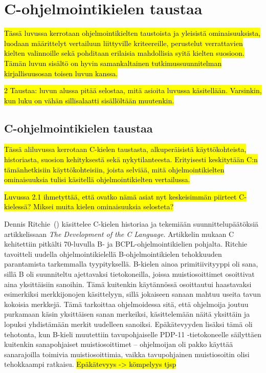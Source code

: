 \section{C-ohjelmointikielen taustaa}

\hl{Tässä luvussa kerrotaan ohjelmointikielten taustoista ja yleisistä
ominaisuuksista, luodaan määrittelyt vertailuun liittyville kriteereille,
perustelut verrattavien kielten valinnoille sekä pohditaan erilaisia
mahdollisia syitä kielten suosioon. Tämän luvun sisältö on hyvin samankaltainen
tutkimussuunnitelman kirjallisuusosan toisen luvun kanssa.}

\hl{ 2 Taustaa: luvun alussa pitää selostaa, mitä asioita luvussa käsitellään.
Varsinkin, kun luku on vähän sillisalaatti sisällöltään muutenkin. }

\subsection{C-ohjelmointikielen taustaa}
\label{sec:ctaustaa}

\hl{Tässä aliluvussa kerrotaan C-kielen taustasta, alkuperäisistä
käyttökohteista, historiasta, suosion kehityksestä sekä nykytilanteesta.
Erityisesti keskitytään C:n tämänhetkisiin käyttökohteisiin, joista selviää,
mitä ohjelmointikielten ominaisuuksia tulisi käsitellä ohjelmointikielten
vertailussa.}

\hl{ Luvussa 2.1 ihmetyttää, että ovatko nämä asiat nyt keskeisimmän piirteet
C-kielessä? Miksei muita kielen ominaisuuksia selosteta? }

Dennis Ritchie~(\citeyear{chistory}) käsittelee C-kielen historiaa ja
tekemiään suunnittelupäätöksiä artikkelissaan \emph{The Development of the C
Language}. Artikkelin mukaan C kehitettiin pitkälti 70-luvulla B- ja
BCPL-ohjelmointikielien pohjalta. Ritchie tavoitteli uudella
ohjelmointikielellä B-ohjelmointikielen tehokkuuden parantamista tarkemmalla
tyypityksellä. B-kielen ainoa primitiivityyppi oli sana, sillä B oli suunniteltu ajettavaksi
tietokoneilla, joissa muistiosoittimet osoittivat aina yksittäisiin sanoihin.
Tämä kuitenkin käytännössä osoittautui haastavaksi esimerkiksi merkkijonojen
käsittelyyn, sillä jokaiseen sanaan mahtuu useita tavun kokoisia
merkkejä. Tämä tarkoittaa ohjelmoidessa sitä, että ohjelmoija joutuu purkamaan
käsin yksittäisen sanan merkeiksi, käsittelemään näitä yksittäin ja lopuksi
yhdistämään merkit uudelleen sanoiksi. Epäkätevyyden lisäksi tämä oli
tehotonta, kun B-kieli muutettiin tavupohjaiselle PDP-11 -tietokoneelle
säilyttäen kuitenkin sanapohjaiset muistiosoittimet -- ohjelmoijan oli pakko
käyttää sanarajoilla toimivia muistiosoittimia, vaikka tavupohjainen
muistiosoitin olisi tehokkaampi ratkaisu.
\hl{Epäkätevyys -> kömpelyys tjsp}


